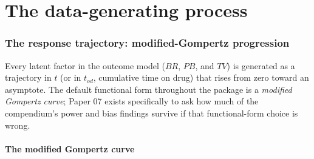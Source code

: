 \documentclass[11pt]{article}
\begin{document}
\part{The data-generating process}

\section{The response trajectory: modified-Gompertz progression}
\label{sec:gompertz}

Every latent factor in the outcome model ($BR$, $PB$, and $TV$) is
generated as a trajectory in $t$ (or in $t_{od}$, cumulative time on
drug) that rises from zero toward an asymptote. The default functional
form throughout the package is a \emph{modified Gompertz curve}; Paper
07 exists specifically to ask how much of the compendium's power and
bias findings survive if that functional-form choice is wrong.

\subsection{The modified Gompertz curve}
\end{document}
